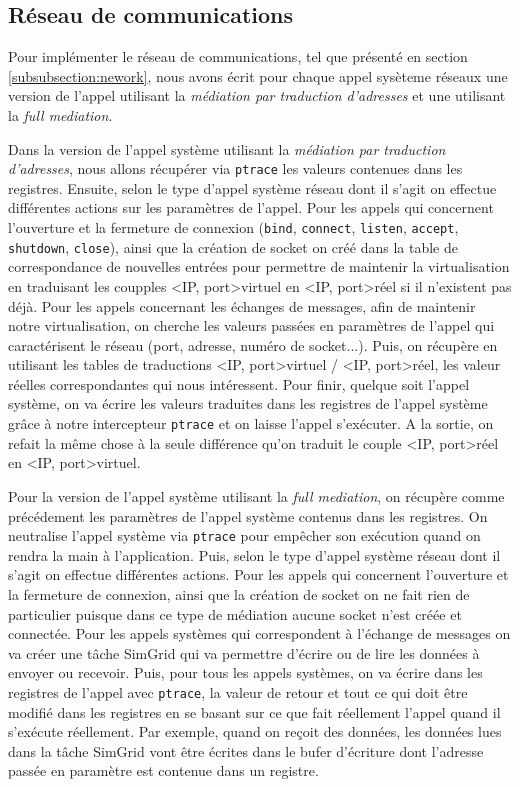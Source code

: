 \subsection{Réseau de communications}
Pour implémenter le réseau de communications, tel que présenté en section \ref{subsubsection:nework}, nous avons écrit pour chaque appel sysèteme réseaux une version de l'appel utilisant la \textit{médiation par traduction d'adresses} et une utilisant la \textit{full mediation}.

Dans la version de l'appel système utilisant la \textit{médiation par traduction d'adresses}, nous allons récupérer via \texttt{ptrace} les valeurs contenues dans les registres. Ensuite, selon le type d'appel système réseau dont il s'agit on effectue différentes actions sur les paramètres de l'appel. Pour les appels qui concernent l'ouverture et la fermeture de connexion (\texttt{bind}, \texttt{connect}, \texttt{listen}, \texttt{accept}, \texttt{shutdown}, \texttt{close}), ainsi que la création de socket on créé dans la table de correspondance de nouvelles entrées pour permettre de maintenir la virtualisation en traduisant les coupples <IP, port>virtuel en <IP, port>réel si il n'existent pas déjà. Pour les appels concernant les échanges de messages, afin de maintenir notre virtualisation, on cherche les valeurs passées en paramètres de l'appel qui caractérisent le réseau (port, adresse, numéro de socket...). Puis, on récupère en utilisant les tables de traductions <IP, port>virtuel / <IP, port>réel, les valeur réelles correspondantes qui nous intéressent. Pour finir, quelque soit l'appel système, on va écrire les valeurs traduites dans les registres de l'appel système grâce à notre intercepteur \texttt{ptrace} et on laisse l'appel s'exécuter. A la sortie, on refait la même chose à la seule différence qu'on traduit le couple  <IP, port>réel en <IP, port>virtuel.

Pour la version de l'appel système utilisant la \textit{full mediation}, on récupère comme précédement les paramètres de l'appel système contenus dans les registres. On neutralise l'appel système via \texttt{ptrace} pour empêcher son exécution quand on rendra la main à l'application. Puis, selon le type d'appel système réseau dont il s'agit on effectue différentes actions. Pour les appels qui concernent l'ouverture et la fermeture de connexion, ainsi que la création de socket on ne fait rien de particulier puisque dans ce type de médiation aucune socket n'est créée et connectée. Pour les appels systèmes qui correspondent à l'échange de messages on va créer une tâche SimGrid qui va permettre d'écrire ou de lire les données à envoyer ou recevoir. Puis, pour tous les appels systèmes, on va écrire dans les registres de l'appel avec \texttt{ptrace}, la valeur de retour et tout ce qui doit être modifié dans les registres en se basant sur ce que fait réellement l'appel quand il s'exécute réellement. Par exemple, quand on reçoit des données, les données lues dans la tâche SimGrid vont être écrites dans le bufer d'écriture dont l'adresse passée en paramètre est contenue dans un registre.
